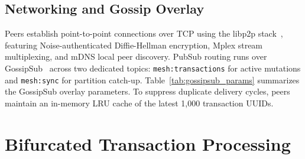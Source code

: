 \subsection{Networking and Gossip Overlay}
Peers establish point-to-point connections over TCP using the libp2p stack~\cite{trautwein2022libp2p}, featuring Noise-authenticated Diffie-Hellman encryption, Mplex stream multiplexing, and mDNS local peer discovery. PubSub routing runs over GossipSub~\cite{vyzovitis2020gossipsub} across two dedicated topics: \texttt{mesh:transactions} for active mutations and \texttt{mesh:sync} for partition catch-up. Table~\ref{tab:gossipsub_params} summarizes the GossipSub overlay parameters. To suppress duplicate delivery cycles, peers maintain an in-memory LRU cache of the latest 1{,}000 transaction UUIDs.

\begin{table}[!t]
\caption{GossipSub Mesh Configuration Parameters}
\label{tab:gossipsub_params}
\centering
{}
\end{table}

\section{Bifurcated Transaction Processing}
\label{sec:bifurcated}

